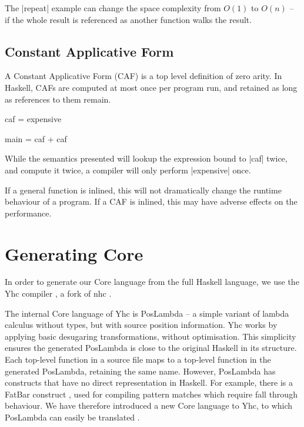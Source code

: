 The |repeat| example can change the space complexity from $O(1)$ to $O(n)$ -- if the whole result is referenced as another function walks the result.

\subsection{Constant Applicative Form}

A Constant Applicative Form (CAF) is a top level definition of zero arity. In Haskell, CAFs are computed at most once per program run, and retained as long as references to them remain.

\begin{example}
\begin{code}
caf = expensive

main = caf + caf
\end{code}

While the semantics presented will lookup the expression bound to |caf| twice, and compute it twice, a compiler will only perform |expensive| once.
\end{example}

If a general function is inlined, this will not dramatically change the runtime behaviour of a program. If a CAF is inlined, this may have adverse effects on the performance.


\section{Generating Core}
\label{secB:generating_core}

In order to generate our Core language from the full Haskell language, we use the Yhc compiler \cite{yhc}, a fork of nhc \cite{nhc}.

The internal Core language of Yhc is PosLambda -- a simple variant of lambda calculus without types, but with source position information. Yhc works by applying basic desugaring transformations, without optimisation. This simplicity ensures the generated PosLambda is close to the original Haskell in its structure. Each top-level function in a source file maps to a top-level function in the generated PosLambda, retaining the same name. However, PosLambda has constructs that have no direct representation in Haskell. For example, there is a FatBar construct \cite{spj:implementation}, used for compiling pattern matches which require fall through behaviour. We have therefore introduced a new Core language to Yhc, to which PosLambda can easily be translated \cite{me:yhc_core}.

